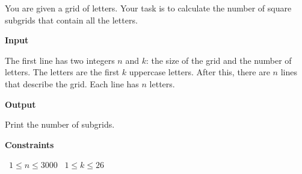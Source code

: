 You are given a grid of letters. Your task is to calculate the number of square subgrids that contain all the letters.

\vspace{0.3cm}\noindent\textbf{Input}

The first line has two integers $n$ and $k$: the size of the grid and the number of letters. The letters are the first $k$ uppercase letters.
After this, there are $n$ lines that describe the grid. Each line has $n$ letters.

\vspace{0.3cm}\noindent\textbf{Output}

Print the number of subgrids.

\vspace{0.3cm}\noindent\textbf{Constraints}

\textbullet\ $1 \le n \le 3000$
\textbullet\ $1 \le k \le 26$